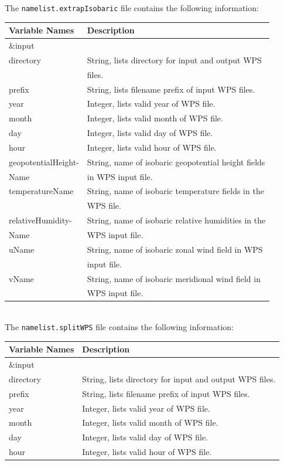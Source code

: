 \newpage
The \texttt{namelist.extrapIsobaric} file contains the following information:


\begin{tabular}{|l|l|} \hline
Variable Names & Description \\ \hline
\&input          & \\ \hline
directory & String, lists directory for input and output WPS \\
&  files. \\ \hline
prefix & String, lists filename prefix of input WPS files. \\ \hline
year & Integer, lists valid year of WPS file. \\ \hline
month & Integer, lists valid month of WPS file. \\ \hline
day & Integer, lists valid day of WPS file. \\ \hline
hour & Integer, lists valid hour of WPS file. \\ \hline
geopotentialHeight- & String, name of isobaric geopotential height fields \\
Name & in WPS input file. \\ \hline
temperatureName & String, name of isobaric temperature fields in the \\
 & WPS file. \\ \hline
relativeHumidity- & String, name of isobaric relative humidities in the \\
Name & WPS input file. \\ \hline
uName & String, name of isobaric zonal wind field in WPS \\
& input file. \\ \hline
vName & String, name of isobaric meridional wind field in \\
 & WPS input file. \\ \hline
\end{tabular} \\


The \texttt{namelist.splitWPS} file contains the following information:


\begin{tabular}{|l|l|} \hline
Variable Names & Description \\ \hline
\&input          & \\ \hline
directory & String, lists directory for input and output WPS files. \\ \hline
prefix & String, lists filename prefix of input WPS files. \\ \hline
year & Integer, lists valid year of WPS file. \\ \hline
month & Integer, lists valid month of WPS file. \\ \hline
day & Integer, lists valid day of WPS file. \\ \hline
hour & Integer, lists valid hour of WPS file. \\ \hline
\end{tabular} \\ \\

